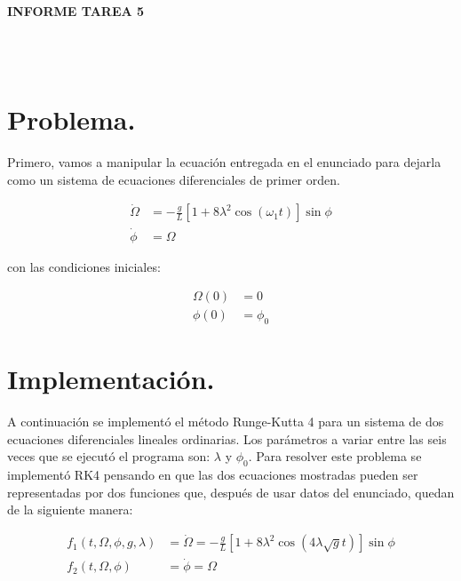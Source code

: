 \documentclass[letter, 11pt]{article}
\begin{document}
\thispagestyle{firstpage}

\begin{center}
  {\uppercase{\LARGE \bf Informe Tarea 5}}
\end{center}

\\
\\











\section{Problema.}

Primero, vamos a manipular la ecuación entregada en el enunciado para dejarla como un sistema de ecuaciones diferenciales de primer orden.

\begin{align*}
  \dot{\Omega}&=-\frac{g}{L}[1+8\lambda^2\cos(\omega_1 t)]\sin\phi\\
  \dot{\phi}&=\Omega
\end{align*}

con las condiciones iniciales:


\begin{align*}
  \Omega(0)&=0\\
  \phi(0)&=\phi_0
\end{align*}


\section{Implementación.}

A continuación se implementó el método Runge-Kutta 4 para un sistema de dos ecuaciones diferenciales lineales ordinarias. Los parámetros a variar entre las seis veces que se ejecutó el programa son: $\lambda$ y $\phi_0$. Para resolver este problema se implementó RK4 pensando en que las dos ecuaciones mostradas pueden ser representadas por dos funciones que, después de usar datos del enunciado, quedan de la siguiente manera:

\begin{align*}
  f_1(t, \Omega, \phi, g, \lambda)&=\dot{\Omega}=-\frac{g}{L}[1+8\lambda^2\cos(4\lambda \sqrt{g} t)]\sin\phi\\
  f_2(t, \Omega, \phi)&=\dot{\phi}=\Omega
\end{align*}
\end{document}

